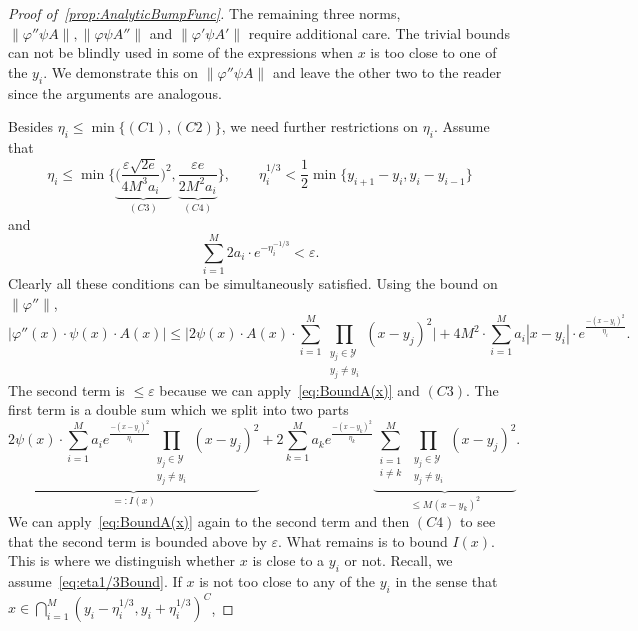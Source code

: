 \documentclass[11pt,a4paper]{article}
\def\cref#1{\ref{#1}}%
\theoremstyle{definition}
\theoremstyle{remark}
\newcommand{\0}{\mathbf{0}}
\numberwithin{equation}{section}
\begin{document}
\begin{proof}[Proof of~\cref{prop:AnalyticBumpFunc}]
The remaining three norms, $\|\varphi'' \psi A\|,\|\varphi \psi A''\|$ and $\|\varphi' \psi A'\|$
require additional care. The trivial bounds can not be blindly used in some of the expressions when
$x$ is too close to one of the $y_i$. We demonstrate this on $\|\varphi'' \psi A\|$ and leave the
other two to the reader since the arguments are analogous.

Besides $\eta_i\leq\min\{(C1),(C2)\}$, we need further restrictions on $\eta_i$. Assume that
\begin{equation}\label{eq:eta1/3Bound}
	\eta_i\leq \min \bigg\{ \underbrace{ \Big( \frac{\varepsilon\sqrt{2e}}{4M^3a_i} \Big)^2
	}_{(C3)}, \underbrace{ \frac{\varepsilon e}{2M^2a_i} }_{(C4)} \bigg\},\qquad
	\eta_i^{1/3} < \frac{1}{2} \min\big\{ y_{i+1}-y_i, y_i-y_{i-1} \big\} 
\end{equation}
and
\begin{equation}\label{eq:etaOtherBound}
	\sum_{i=1}^M 2a_i\cdot e^{-\eta_i^{-1/3}} < \varepsilon.
\end{equation}
Clearly all these conditions can be simultaneously satisfied. Using the bound on $\|\varphi''\|$,
\begin{equation*}
	\big|\varphi''(x)\cdot \psi(x)\cdot A(x)\big|\leq  \bigg| 2\psi(x)\cdot A(x)\cdot
	\sum_{i=1}^{M}  \prod_{\substack{y_j\in\mathcal{Y}\\ y_j\neq y_i}} (x-y_j)^2 \bigg| +
	4M^2\cdot \sum_{i=1}^{M} a_i|x-y_i| \cdot e^{\frac{-(x-y_i)^2}{\eta_i}}.
\end{equation*}
The second term is $\leq \varepsilon$ because we can apply~\cref{eq:BoundA(x)} and $(C3)$. The first
term is a double sum which we split into two parts
\begin{equation*}
	\underbrace{2\psi(x)\cdot  \sum_{i=1}^{M} a_i e^{\frac{-(x-y_i)^2}{\eta_i}}
	\prod_{\substack{y_j\in\mathcal{Y}\\ y_j\neq y_i}} (x-y_j)^2}_{=: I(x)} +
	2 \sum_{k=1}^{M}  a_k  e^{\frac{-(x-y_k)^2}{\eta_k}} \underbrace{\sum_{\substack{i=1 \\
	i\neq k}}^{M} \prod_{\substack{y_j\in\mathcal{Y}\\ y_j\neq y_i}} (x-y_j)^2}_{\leq
      M(x-y_k)^2}.
\end{equation*} 
We can apply~\cref{eq:BoundA(x)} again to the second term and then $(C4)$ to see that the second
term is bounded above by $\varepsilon$. What remains is to bound $I(x)$. This is where we distinguish whether
$x$ is close to a $y_i$ or not. Recall, we assume~\cref{eq:eta1/3Bound}. If $x$ is not too close to
any of the $y_i$ in the sense that $x\in\bigcap_{i=1}^M (y_i-\eta_i^{1/3}, y_i+\eta_i^{1/3})^C$,

\end{proof}
\end{document}
